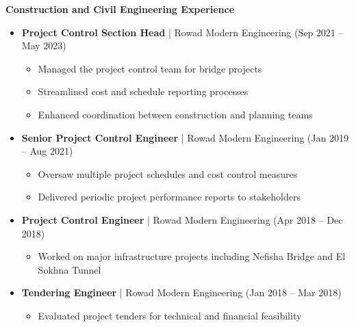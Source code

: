 \documentclass[10pt, letterpaper]{article}
\begin{document}
{\begin{minipage}{\dimexpr\textwidth-2\fboxsep-2\fboxrule\relax}
\textbf{\textcolor{primaryColor}{Construction and Civil Engineering Experience}}
\begin{itemize}[leftmargin=*]
    \item \textbf{Project Control Section Head} | Rowad Modern Engineering (Sep 2021 -- May 2023)
    \begin{itemize}[leftmargin=1cm]
        \item Managed the project control team for bridge projects
        \item Streamlined cost and schedule reporting processes
        \item Enhanced coordination between construction and planning teams
    \end{itemize}
    
    \item \textbf{Senior Project Control Engineer} | Rowad Modern Engineering (Jan 2019 -- Aug 2021)
    \begin{itemize}[leftmargin=1cm]
        \item Oversaw multiple project schedules and cost control measures
        \item Delivered periodic project performance reports to stakeholders
    \end{itemize}

    \item \textbf{Project Control Engineer} | Rowad Modern Engineering (Apr 2018 -- Dec 2018)
    \begin{itemize}[leftmargin=1cm]
        \item Worked on major infrastructure projects including Nefisha Bridge and El Sokhna Tunnel
    \end{itemize}
    
    \item \textbf{Tendering Engineer} | Rowad Modern Engineering (Jan 2018 -- Mar 2018)
    \begin{itemize}[leftmargin=1cm]
        \item Evaluated project tenders for technical and financial feasibility
    \end{itemize}
\end{itemize}
\end{minipage}}

\newpage
\end{document}
